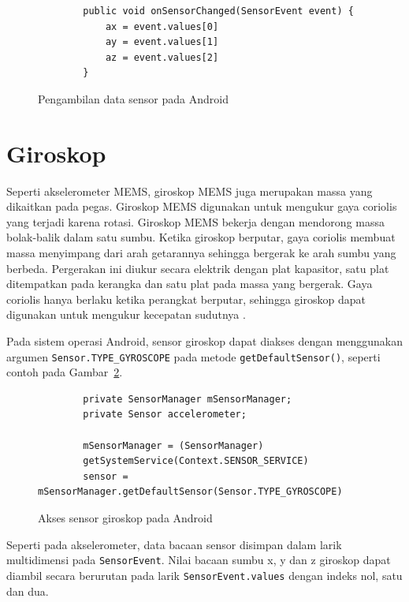 \begin{figure}[h]
    \begin{verbatim}
        public void onSensorChanged(SensorEvent event) {
            ax = event.values[0]
            ay = event.values[1]
            az = event.values[2]
        }
    \end{verbatim}
    \caption{Pengambilan data sensor pada Android}
    \label{listing:teori-pengambilan-data-sensor}
\end{figure}



\section{Giroskop}
Seperti akselerometer MEMS, giroskop MEMS juga merupakan massa yang dikaitkan pada pegas. Giroskop MEMS digunakan untuk mengukur gaya coriolis yang terjadi karena rotasi. Giroskop MEMS bekerja dengan mendorong massa bolak-balik dalam satu sumbu. Ketika giroskop berputar, gaya coriolis membuat massa menyimpang dari arah getarannya sehingga bergerak ke arah sumbu yang berbeda. Pergerakan ini diukur secara elektrik dengan plat kapasitor, satu plat ditempatkan pada kerangka dan satu plat pada massa yang bergerak. Gaya coriolis hanya berlaku ketika perangkat berputar, sehingga giroskop dapat digunakan untuk mengukur kecepatan sudutnya \citep{milette-2012}.

Pada sistem operasi Android, sensor giroskop dapat diakses dengan menggunakan argumen \texttt{Sensor.TYPE_GYROSCOPE} pada metode \texttt{getDefaultSensor()}, seperti contoh pada Gambar~\ref{listing:teori-akses-giroskop}.

\begin{figure}[h]
    \begin{verbatim}
        private SensorManager mSensorManager;
        private Sensor accelerometer;

        mSensorManager = (SensorManager)
        getSystemService(Context.SENSOR_SERVICE)
        sensor = mSensorManager.getDefaultSensor(Sensor.TYPE_GYROSCOPE)
    \end{verbatim}
    \caption{Akses sensor giroskop pada Android}
    \label{listing:teori-akses-giroskop}
\end{figure}

Seperti pada akselerometer, data bacaan sensor disimpan dalam larik multidimensi pada \texttt{SensorEvent}. Nilai bacaan sumbu x, y dan z giroskop dapat diambil secara berurutan pada larik \texttt{SensorEvent.values} dengan indeks nol, satu dan dua.


